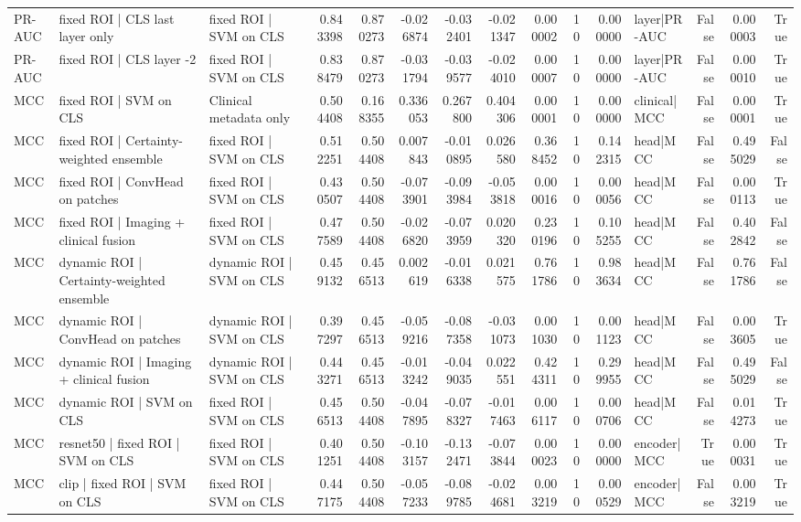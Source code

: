 \begin{table}
\begin{tabular}{lllrrrrrrrrlrrr}
PR-AUC & fixed ROI | CLS last layer only & fixed ROI | SVM on CLS & 0.843398 & 0.870273 & -0.026874 & -0.032401 & -0.021347 & 0.000002 & 10 & 0.000000 & layer|PR-AUC & False & 0.000003 & True \\
PR-AUC & fixed ROI | CLS layer -2 & fixed ROI | SVM on CLS & 0.838479 & 0.870273 & -0.031794 & -0.039577 & -0.024010 & 0.000007 & 10 & 0.000000 & layer|PR-AUC & False & 0.000010 & True \\
MCC & fixed ROI | SVM on CLS & Clinical metadata only & 0.504408 & 0.168355 & 0.336053 & 0.267800 & 0.404306 & 0.000001 & 10 & 0.000000 & clinical|MCC & False & 0.000001 & True \\
MCC & fixed ROI | Certainty-weighted ensemble & fixed ROI | SVM on CLS & 0.512251 & 0.504408 & 0.007843 & -0.010895 & 0.026580 & 0.368452 & 10 & 0.142315 & head|MCC & False & 0.495029 & False \\
MCC & fixed ROI | ConvHead on patches & fixed ROI | SVM on CLS & 0.430507 & 0.504408 & -0.073901 & -0.093984 & -0.053818 & 0.000016 & 10 & 0.000056 & head|MCC & False & 0.000113 & True \\
MCC & fixed ROI | Imaging + clinical fusion & fixed ROI | SVM on CLS & 0.477589 & 0.504408 & -0.026820 & -0.073959 & 0.020320 & 0.230196 & 10 & 0.105255 & head|MCC & False & 0.402842 & False \\
MCC & dynamic ROI | Certainty-weighted ensemble & dynamic ROI | SVM on CLS & 0.459132 & 0.456513 & 0.002619 & -0.016338 & 0.021575 & 0.761786 & 10 & 0.983634 & head|MCC & False & 0.761786 & False \\
MCC & dynamic ROI | ConvHead on patches & dynamic ROI | SVM on CLS & 0.397297 & 0.456513 & -0.059216 & -0.087358 & -0.031073 & 0.001030 & 10 & 0.001123 & head|MCC & False & 0.003605 & True \\
MCC & dynamic ROI | Imaging + clinical fusion & dynamic ROI | SVM on CLS & 0.443271 & 0.456513 & -0.013242 & -0.049035 & 0.022551 & 0.424311 & 10 & 0.299955 & head|MCC & False & 0.495029 & False \\
MCC & dynamic ROI | SVM on CLS & fixed ROI | SVM on CLS & 0.456513 & 0.504408 & -0.047895 & -0.078327 & -0.017463 & 0.006117 & 10 & 0.000706 & head|MCC & False & 0.014273 & True \\
MCC & resnet50 | fixed ROI | SVM on CLS & fixed ROI | SVM on CLS & 0.401251 & 0.504408 & -0.103157 & -0.132471 & -0.073844 & 0.000023 & 10 & 0.000000 & encoder|MCC & True & 0.000031 & True \\
MCC & clip | fixed ROI | SVM on CLS & fixed ROI | SVM on CLS & 0.447175 & 0.504408 & -0.057233 & -0.089785 & -0.024681 & 0.003219 & 10 & 0.000529 & encoder|MCC & False & 0.003219 & True \\

\end{tabular}
\end{table}
